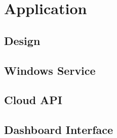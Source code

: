 \chapter{Application}
\label{chapter:application}


\section{Design}
\label{section:design}

\section{Windows Service}
\label{section:winService}


\section{Cloud API}
\label{section:cloudApi}

\section{Dashboard Interface}
\label{section:dashboard}